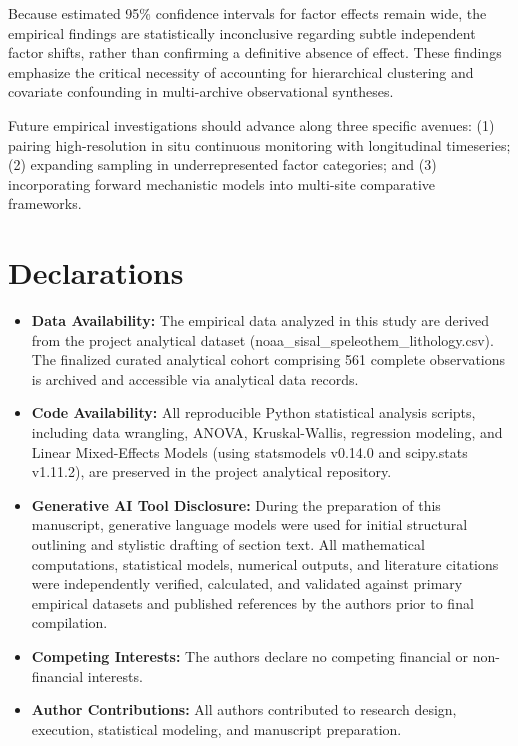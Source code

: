 \documentclass[sn-basic,Numbered]{sn-jnl}%
\begin{document}
Because estimated 95\% confidence intervals for factor effects remain wide, the empirical findings are statistically inconclusive regarding subtle independent factor shifts, rather than confirming a definitive absence of effect. These findings emphasize the critical necessity of accounting for hierarchical clustering and covariate confounding in multi-archive observational syntheses.

Future empirical investigations should advance along three specific avenues: (1) pairing high-resolution in situ continuous monitoring with longitudinal timeseries; (2) expanding sampling in underrepresented factor categories; and (3) incorporating forward mechanistic models into multi-site comparative frameworks.

\section*{Declarations}
\begin{itemize}
    \item \textbf{Data Availability:} The empirical data analyzed in this study are derived from the project analytical dataset (noaa\_sisal\_speleothem\_lithology.csv). The finalized curated analytical cohort comprising 561 complete observations is archived and accessible via analytical data records.
    \item \textbf{Code Availability:} All reproducible Python statistical analysis scripts, including data wrangling, ANOVA, Kruskal-Wallis, regression modeling, and Linear Mixed-Effects Models (using statsmodels v0.14.0 and scipy.stats v1.11.2), are preserved in the project analytical repository.
    \item \textbf{Generative AI Tool Disclosure:} During the preparation of this manuscript, generative language models were used for initial structural outlining and stylistic drafting of section text. All mathematical computations, statistical models, numerical outputs, and literature citations were independently verified, calculated, and validated against primary empirical datasets and published references by the authors prior to final compilation.
    \item \textbf{Competing Interests:} The authors declare no competing financial or non-financial interests.
    \item \textbf{Author Contributions:} All authors contributed to research design, execution, statistical modeling, and manuscript preparation.
\end{itemize}


\end{document}
